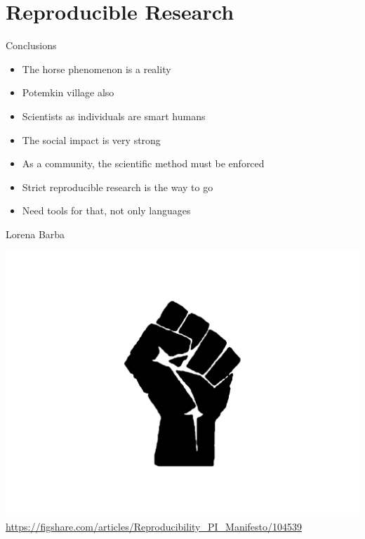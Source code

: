 \documentclass[compress]{beamer}
\begin{document}
\section{Reproducible Research}

\begin{frame}{Conclusions}
\begin{itemize}
\item The horse phenomenon is a reality
\item Potemkin village also
\item Scientists as individuals are smart humans
\item The social impact is very strong
\item As a community, the scientific method must be enforced
\item Strict reproducible research is the way to go
\item Need tools for that, not only languages
\end{itemize}
\end{frame}

\begin{frame}{Lorena Barba}
\begin{center}
\includegraphics[width=.7\columnwidth]{figures/manifesto} \\
\url{https://figshare.com/articles/Reproducibility_PI_Manifesto/104539}
\end{center}
\end{frame}
\end{document}
